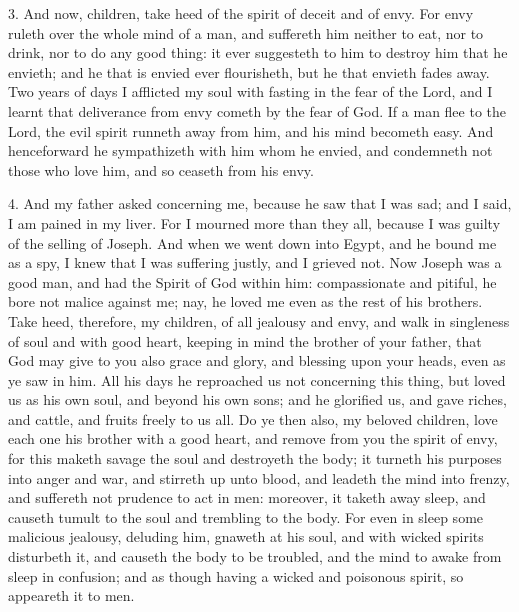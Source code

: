 3. And now, children, take heed of the spirit of deceit and of envy. For envy ruleth over the whole mind of a man, and suffereth him neither to eat, nor to drink, nor to do any good thing: it ever suggesteth to him to destroy him that he envieth; and he that is envied ever flourisheth, but he that envieth fades away. Two years of days I afflicted my soul with fasting in the fear of the Lord, and I learnt that deliverance from envy cometh by the fear of God. If a man flee to the Lord, the evil spirit runneth away from him, and his mind becometh easy. And henceforward he sympathizeth with him whom he envied, and condemneth not those who love him, and so ceaseth from his envy.

4. And my father asked concerning me, because he saw that I was sad; and I said, I am pained in my liver. For I mourned more than they all, because I was guilty of the selling of Joseph. And when we went down into Egypt, and he bound me as a spy, I knew that I was suffering justly, and I grieved not. Now Joseph was a good man, and had the Spirit of God within him: compassionate and pitiful, he bore not malice against me; nay, he loved me even as the rest of his brothers. Take heed, therefore, my children, of all jealousy and envy, and walk in singleness of soul and with good heart, keeping in mind the brother of your father, that God may give to you also grace and glory, and blessing upon your heads, even as ye saw in him. All his days he reproached us not concerning this thing, but loved us as his own soul, and beyond his own sons; and he glorified us, and gave riches, and cattle, and fruits freely to us all. Do ye then also, my beloved children, love each one his brother with a good heart, and remove from you the spirit of envy, for this maketh savage the soul and destroyeth the body; it turneth his purposes into anger and war, and stirreth up unto blood, and leadeth the mind into frenzy, and suffereth not prudence to act in men: moreover, it taketh away sleep, and causeth tumult to the soul and trembling to the body. For even in sleep some malicious jealousy, deluding him, gnaweth at his soul, and with wicked spirits disturbeth it, and causeth the body to be troubled, and the mind to awake from sleep in confusion; and as though having a wicked and poisonous spirit, so appeareth it to men.

